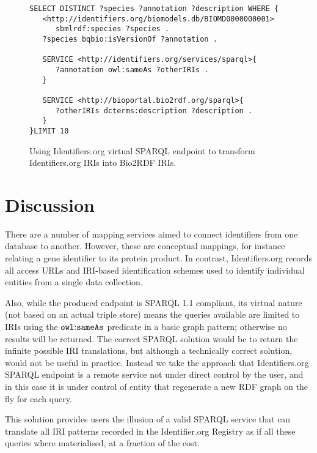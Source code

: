 \documentclass{bioinfo}
\begin{document}
\begin{figure}[h]
{\scriptsize
\begin{verbatim}
SELECT DISTINCT ?species ?annotation ?description WHERE { 
   <http://identifiers.org/biomodels.db/BIOMD0000000001> 
      sbmlrdf:species ?species . 
   ?species bqbio:isVersionOf ?annotation .
   
   SERVICE <http://identifiers.org/services/sparql>{
      ?annotation owl:sameAs ?otherIRIs .
   }
   
   SERVICE <http://bioportal.bio2rdf.org/sparql>{
      ?otherIRIs dcterms:description ?description .
   }        
}LIMIT 10
\end{verbatim}
}
  \caption{Using Identifiers.org virtual SPARQL endpoint to transform Identifiers.org IRIs into Bio2RDF IRIs.}
  \label{translatestuff}
\end{figure}

\section{Discussion}
There are a number of mapping services aimed to connect identifiers from one database to another. However, these are conceptual mappings, for instance relating a gene identifier to its protein product. In contrast, Identifiers.org records all access URLs and IRI-based identification schemes used to identify individual entities from a single data collection.

Also, while the produced endpoint is SPARQL 1.1 compliant, its virtual nature (not based on an actual triple store) means the queries available are limited to IRIs using the $\mathtt{owl\text{\rm :}{}sameAs}$ predicate in a basic graph pattern; otherwise no results will be returned. The correct SPARQL solution would be to return the infinite possible IRI translations, but although a technically correct solution, would not be useful in practice. Instead we take the approach that Identifiers.org SPARQL endpoint is a remote service not under direct control by the user, and in this case it is under control of entity that regenerate a new RDF graph on the fly for each query.

This solution provides users the illusion of a valid SPARQL service that can translate all IRI patterns recorded in the Identifier.org Registry as if all these queries where materialised, at a fraction of the cost.
\end{document}

